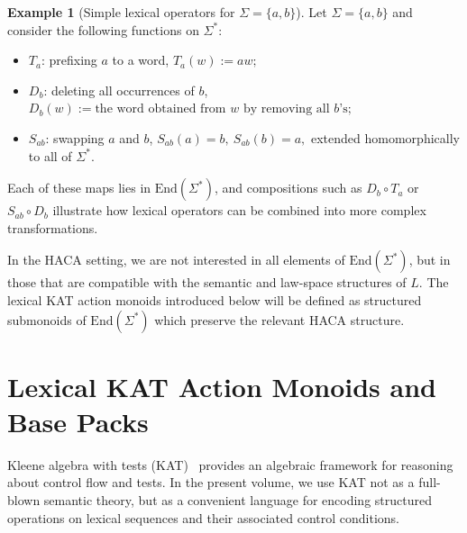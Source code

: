 \documentclass[11pt]{book}
\theoremstyle{plain}
\theoremstyle{definition}
\newtheorem{example}[theorem]{Example}
\theoremstyle{remark}
\begin{document}
\begin{example}[Simple lexical operators for $\Sigma=\{a,b\}$]
\label{ex:lexical-operators-ab}
Let $\Sigma=\{a,b\}$ and consider the following functions on $\Sigma^*$:
\begin{itemize}
  \item $T_a$: prefixing $a$ to a word,
        \(
          T_a(w) := a w;
        \)
  \item $D_b$: deleting all occurrences of $b$,
        \(
          D_b(w) := \text{the word obtained from $w$ by removing all $b$'s};
        \)
  \item $S_{ab}$: swapping $a$ and $b$,
        \(
          S_{ab}(a) = b,\ S_{ab}(b) = a,
        \)
        extended homomorphically to all of $\Sigma^*$.
\end{itemize}
Each of these maps lies in $\mathrm{End}(\Sigma^*)$, and compositions
such as $D_b\circ T_a$ or $S_{ab}\circ D_b$ illustrate how lexical
operators can be combined into more complex transformations.
\end{example}

In the HACA setting, we are not interested in all elements of
$\mathrm{End}(\Sigma^*)$, but in those that are compatible with the
semantic and law-space structures of $L$. The lexical KAT action
monoids introduced below will be defined as structured submonoids of
$\mathrm{End}(\Sigma^*)$ which preserve the relevant HACA structure.

\section[Lexical KAT Action Monoids and Base Packs]{Lexical KAT Action Monoids and Base Packs}


Kleene algebra with tests (KAT)~\cite{KozenSmithKAT1996} provides an algebraic framework for
reasoning about control flow and tests. In the present volume, we use
KAT not as a full-blown semantic theory, but as a convenient language
for encoding structured operations on lexical sequences and their
associated control conditions.
\end{document}
